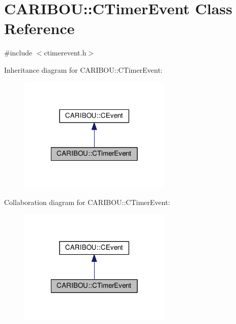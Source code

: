 \section{C\-A\-R\-I\-B\-O\-U\-:\-:C\-Timer\-Event Class Reference}
\label{class_c_a_r_i_b_o_u_1_1_c_timer_event}


{\ttfamily \#include $<$ctimerevent.\-h$>$}



Inheritance diagram for C\-A\-R\-I\-B\-O\-U\-:\-:C\-Timer\-Event\-:\nopagebreak
\begin{figure}[H]
\begin{center}
\leavevmode
\includegraphics[width=206pt]{class_c_a_r_i_b_o_u_1_1_c_timer_event__inherit__graph}
\end{center}
\end{figure}


Collaboration diagram for C\-A\-R\-I\-B\-O\-U\-:\-:C\-Timer\-Event\-:\nopagebreak
\begin{figure}[H]
\begin{center}
\leavevmode
\includegraphics[width=206pt]{class_c_a_r_i_b_o_u_1_1_c_timer_event__coll__graph}
\end{center}
\end{figure}
